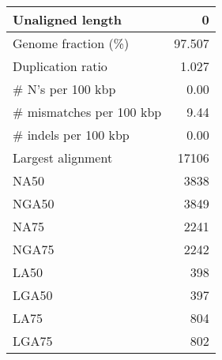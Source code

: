 \documentclass[12pt,a4paper]{article}
\begin{document}
\begin{table}[ht]
\begin{center}
\begin{tabular}{|l*{1}{|r}|}
Unaligned length & 0 \\ \hline
Genome fraction (\%) & 97.507 \\ \hline
Duplication ratio & 1.027 \\ \hline
\# N's per 100 kbp & 0.00 \\ \hline
\# mismatches per 100 kbp & 9.44 \\ \hline
\# indels per 100 kbp & 0.00 \\ \hline
Largest alignment & 17106 \\ \hline
NA50 & 3838 \\ \hline
NGA50 & 3849 \\ \hline
NA75 & 2241 \\ \hline
NGA75 & 2242 \\ \hline
LA50 & 398 \\ \hline
LGA50 & 397 \\ \hline
LA75 & 804 \\ \hline
LGA75 & 802 \\ \hline
\end{tabular}
\end{center}
\end{table}
\end{document}
